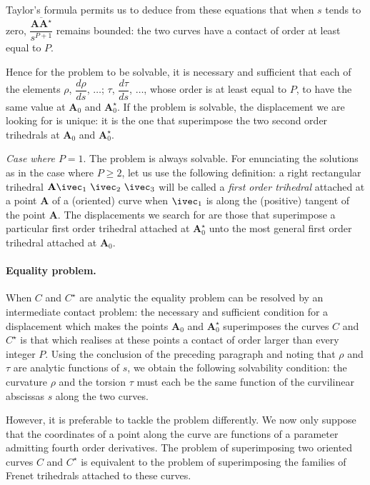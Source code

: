 Taylor's formula permits us to deduce from these equations that when $s$ tends to zero, $\dfrac{\overline{\mathbf{AA}^{\star}}}{s^{P+1}}$ remains bounded: the two curves have a contact of order at least equal to $P$.

Hence for the problem to be solvable, it is necessary and sufficient that each of the elements $\rho$, $\dfrac{d\rho}{ds}$, $\dots$; $\tau$, $\dfrac{d\tau}{ds}$, $\dots$, whose order is at least equal to $P$, to have the same value at $\mathbf{A}_{0}$ and $\mathbf{A}_{0}^{\star}$. If the problem is solvable, the displacement we are looking for is unique: it is the one that superimpose the two second order trihedrals at $\mathbf{A}_{0}$ and $\mathbf{A}_{0}^{\star}$.

\somespace

\emph{Case where $P=1$}. The problem is always solvable. For enunciating the solutions as in the case where $P\ge 2$, let us use the following definition: a right rectangular trihedral $\mathbf{A}\ivec_{1}\ \ivec_{2}\ \ivec_{3}$ will be called a \emph{first order trihedral} attached at a point $\mathbf{A}$ of a (oriented) curve when $\ivec_{1}$ is along the (positive) tangent of the point $\mathbf{A}$. The displacements we search for are those that superimpose a particular first order trihedral attached at $\mathbf{A}_{0}^{\star}$ unto the most general first order trihedral attached at $\mathbf{A}_{0}$.

\paragraph{Equality problem.}
\label{sec:13}
When $C$ and $C^{\star}$ are analytic the equality problem can be resolved by an intermediate contact problem: the necessary and sufficient condition for a displacement which makes the points $\mathbf{A}_{0}$ and $\mathbf{A}_{0}^{\star}$ superimposes the curves $C$ and $C^{\star}$ is that which realises at these points a contact of order larger than every integer $P$. Using the conclusion of the preceding paragraph and noting that $\rho$ and $\tau$ are analytic functions of $s$, we obtain the following solvability condition: the curvature $\rho$ and the torsion $\tau$ must each be the same function of the curvilinear abscissas $s$ along the two curves.

However, it is preferable to tackle the problem differently. We now only suppose that the coordinates of a point along the curve are functions of a parameter admitting fourth order derivatives. The problem of superimposing two oriented curves $C$ and $C^{\star}$ is equivalent to the problem of superimposing the families of Frenet trihedrals attached to these curves.

